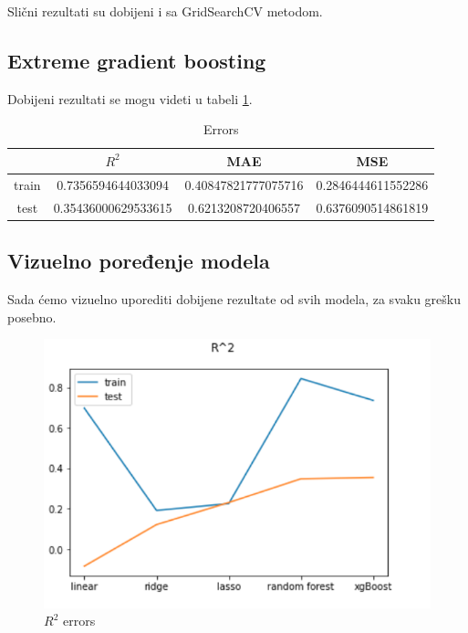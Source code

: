 \documentclass[a4paper]{article}
\begin{document}
Slični rezultati su dobijeni i sa GridSearchCV metodom.

\subsection{Extreme gradient boosting}
\label{sec:xgBoost_2}

Dobijeni rezultati se mogu videti u tabeli \ref{table:table_14}.

\begin{table}[h!]
\caption{Errors}
\centering %
\begin{tabular}{c c c c} %
\hline\hline %
 & ${R}^2$ & MAE & MSE \\ [0.2ex] %
\hline %
train & 0.7356594644033094 & 0.40847821777075716 & 0.2846444611552286 \\ %
test & 0.35436000629533615 & 0.6213208720406557 & 0.6376090514861819 \\ [1ex] %
\end{tabular}
\label{table:table_14}
\end{table}

\pagebreak

\subsection{Vizuelno poređenje modela}
\label{sec:plotting_1}

Sada ćemo vizuelno uporediti dobijene rezultate od svih modela, za svaku grešku posebno.

\begin{figure}[h!]
\begin{center}
\includegraphics[scale=0.3]{r2_2.png}
\caption{${R}^2$ errors}
\label{fig:r2}
\end{center}
\end{figure}
\end{document}
